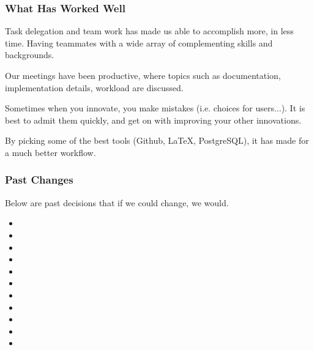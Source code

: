 \documentclass{beamer}
\newcounter{tools}
\begin{document}
\begin{frame}
    \frametitle{What Has Worked Well}

    \begin{description}[<+->]
        \item[Teamwork] Task delegation and team work has made us able to accomplish more, in less time. Having teammates with a wide array of complementing skills and backgrounds.
        \item[Meetings] Our meetings have been productive, where topics such as documentation, implementation details, workload are discussed.
        \item[Changes] Sometimes when you innovate, you make mistakes (i.e. choices for users$\ldots$). It is best to admit them quickly, and get on with improving your other innovations. %
        \item[Tools] By picking some of the best tools (Github, \LaTeX{}, PostgreSQL), it has made for a much better workflow.
    \end{description}
\end{frame}


\begin{frame}
    \frametitle{Past Changes}
    Below are past decisions that if we could change, we would. \pause

    \begin{itemize}
        \item
        \item
        \item
        \item
        \item
        \item
        \item
        \item
        \item
        \item
        \item
    \end{itemize}
\end{frame}
\end{document}
